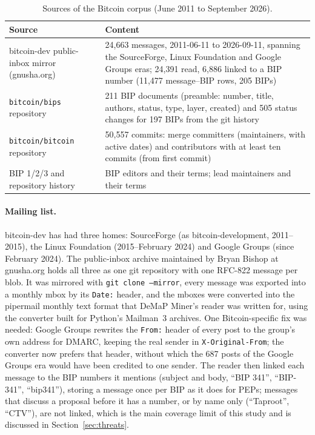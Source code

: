 \documentclass[sigconf,screen]{acmart}
\begin{document}
\begin{table}[t]
\caption{Sources of the Bitcoin corpus (June 2011 to September 2026).}
\label{tab:sources}
\footnotesize
\setlength{\tabcolsep}{3.5pt}
\begin{tabular}{p{}p{}}
\toprule
Source & Content \\
\midrule
bitcoin-dev public-inbox mirror (gnusha.org) & 24,663 messages, 2011-06-11 to 2026-09-11, spanning the SourceForge, Linux Foundation and Google Groups eras; 24,391 read, 6,886 linked to a BIP number (11,477 message--BIP rows, 205 BIPs) \\
\texttt{bitcoin/bips} repository & 211 BIP documents (preamble: number, title, authors, status, type, layer, created) and 505 status changes for 197 BIPs from the git history \\
\texttt{bitcoin/bitcoin} repository & 50,557 commits: merge committers (maintainers, with active dates) and contributors with at least ten commits (from first commit) \\
BIP 1/2/3 and repository history & BIP editors and their terms; lead maintainers and their terms \\
\bottomrule
\end{tabular}
\end{table}

\paragraph{Mailing list.} bitcoin-dev has had three homes: SourceForge (as bitcoin-development, 2011--2015), the Linux Foundation (2015--February 2024) and Google Groups (since February 2024). The public-inbox archive maintained by Bryan Bishop at gnusha.org \cite{gnusha} holds all three as one git repository with one RFC-822 message per blob. It was mirrored with \texttt{git clone --mirror}, every message was exported into a monthly mbox by its \texttt{Date:} header, and the mboxes were converted into the pipermail monthly text format that DeMaP Miner's reader was written for, using the converter built for Python's Mailman~3 archives. One Bitcoin-specific fix was needed: Google Groups rewrites the \texttt{From:} header of every post to the group's own address for DMARC, keeping the real sender in \texttt{X-Original-From}; the converter now prefers that header, without which the 687 posts of the Google Groups era would have been credited to one sender. The reader then linked each message to the BIP numbers it mentions (subject and body, ``BIP 341'', ``BIP-341'', ``bip341''), storing a message once per BIP as it does for PEPs; messages that discuss a proposal before it has a number, or by name only (``Taproot'', ``CTV''), are not linked, which is the main coverage limit of this study and is discussed in Section~\ref{sec:threats}.
\end{document}
